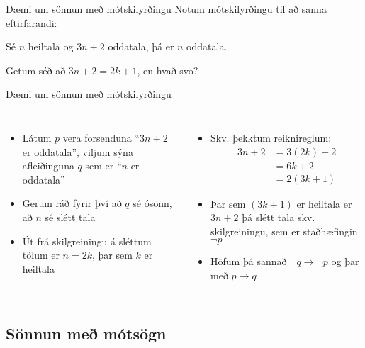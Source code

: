 \documentclass[handout]{beamer}
\begin{document}
\begin{frame}{Dæmi um sönnun með mótskilyrðingu}
    Notum mótskilyrðingu til að sanna eftirfarandi:
    \begin{tcolorbox}
        Sé $n$ heiltala og $3n+2$ oddatala, þá er $n$ oddatala.
    \end{tcolorbox}
    Getum séð að $3n + 2 = 2k+1$, en hvað svo?
\end{frame}

\begin{frame}{Dæmi um sönnun með mótskilyrðingu}
    \begin{columns}
        \begin{itemize}[<+->]
            \item Látum $p$ vera forsenduna ``$3n+2$ er oddatala'', viljum sýna afleiðinguna $q$ sem er ``$n$ er oddatala''
            \item Gerum ráð fyrir því að $q$ sé ósönn, að $n$ sé slétt tala
            \item Út frá skilgreiningu á sléttum tölum er $n = 2k$, þar sem $k$ er heiltala
        \end{itemize}
        \begin{itemize}[<+->]
            \item Skv. þekktum reiknireglum:
            \begin{align*}
                3n+2 &= 3(2k)+2\\
                &=6k+2\\
                &=2(3k+1)
            \end{align*}
            \item Þar sem $(3k+1)$ er heiltala er $3n+2$ þá slétt tala skv. skilgreiningu, sem er staðhæfingin $\lnot p$
            \item Höfum þá sannað $\lnot q \to \lnot p$ og þar með $p \to q$
        \end{itemize}
    \end{columns}
\end{frame}

\subsection{Sönnun með mótsögn}
\end{document}
